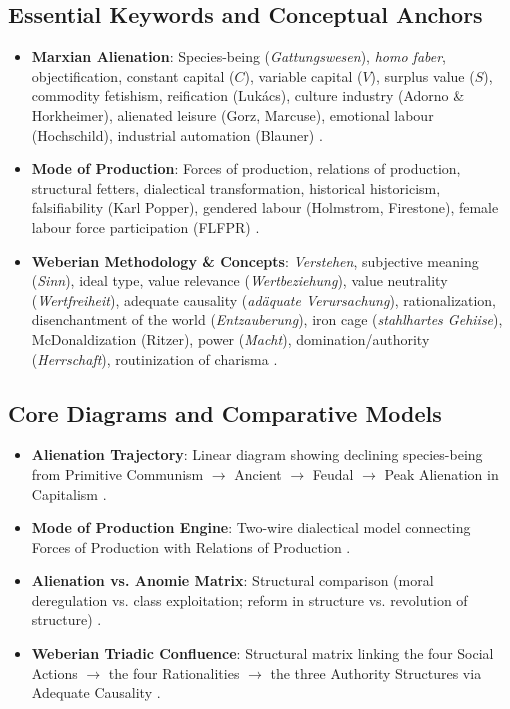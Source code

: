 \subsection{Essential Keywords and Conceptual Anchors}
\begin{itemize}
    \item \textbf{Marxian Alienation}: Species-being (\textit{Gattungswesen}), \textit{homo faber}, objectification, constant capital ($C$), variable capital ($V$), surplus value ($S$), commodity fetishism, reification (Luk\'acs), culture industry (Adorno \& Horkheimer), alienated leisure (Gorz, Marcuse), emotional labour (Hochschild), industrial automation (Blauner) .
    \item \textbf{Mode of Production}: Forces of production, relations of production, structural fetters, dialectical transformation, historical historicism, falsifiability (Karl Popper), gendered labour (Holmstrom, Firestone), female labour force participation (FLFPR) .
    \item \textbf{Weberian Methodology \& Concepts}: \textit{Verstehen}, subjective meaning (\textit{Sinn}), ideal type, value relevance (\textit{Wertbeziehung}), value neutrality (\textit{Wertfreiheit}), adequate causality (\textit{ad\"aquate Verursachung}), rationalization, disenchantment of the world (\textit{Entzauberung}), iron cage (\textit{stahlhartes Gehiise}), McDonaldization (Ritzer), power (\textit{Macht}), domination/authority (\textit{Herrschaft}), routinization of charisma .
\end{itemize}

\subsection{Core Diagrams and Comparative Models}
\begin{itemize}
    \item \textbf{Alienation Trajectory}: Linear diagram showing declining species-being from Primitive Communism $\rightarrow$ Ancient $\rightarrow$ Feudal $\rightarrow$ Peak Alienation in Capitalism .
    \item \textbf{Mode of Production Engine}: Two-wire dialectical model connecting Forces of Production with Relations of Production .
    \item \textbf{Alienation vs. Anomie Matrix}: Structural comparison (moral deregulation vs. class exploitation; reform in structure vs. revolution of structure) .
    \item \textbf{Weberian Triadic Confluence}: Structural matrix linking the four Social Actions $\rightarrow$ the four Rationalities $\rightarrow$ the three Authority Structures via Adequate Causality .
\end{itemize}


